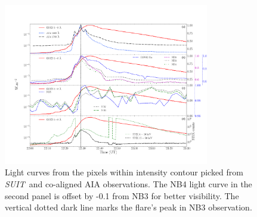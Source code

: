 \documentclass[12pt]{article}
\newcommand{\suit}{{\it{SUIT}}}
\begin{document}
\begin{figure}
    \centering
    \includegraphics[width=0.8\textwidth,trim={2.3cm 2.5cm 0cm 4.5cm},clip]{lc_suit_contour.pdf}
    \caption{Light curves from the pixels within intensity contour picked from \suit~and co-aligned AIA observations. The NB4 light curve in the second panel is offset by -0.1 from NB3 for better visibility. The vertical dotted dark line marks the flare's peak in NB3 observation.}
    \label{fig:flare_lc_suit}
\end{figure}
\end{document}
